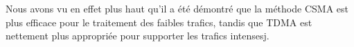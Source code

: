 



\cite{_evaluation_} Nous avons vu en effet plus haut qu’il a été démontré que la méthode CSMA est plus efficace pour le traitement des faibles trafics,
	tandis que TDMA est nettement plus appropriée pour supporter les trafics intensesj.





